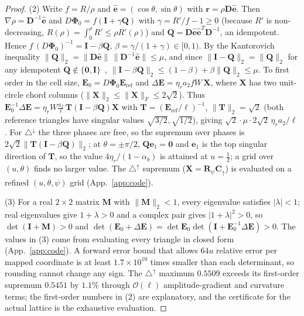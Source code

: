 \documentclass[11pt,a4paper]{article}
\theoremstyle{definition}
\theoremstyle{remark}
\begin{document}
\begin{proof}
(2) Write $f = R/\rho$ and $\hat{\mathbf{e}} = (\cos\theta,\sin\theta)$ with $\mathbf{r} = \rho\mathbf{D}\hat{\mathbf{e}}$. Then $\nabla\rho = \mathbf{D}^{-1}\hat{\mathbf{e}}$ and
$D\mathbf{\Phi}_0 = f(\mathbf{I}+\gamma\mathbf{Q})$ with $\gamma = R'/f - 1 \ge 0$ (because $R'$ is non-decreasing, $R(\rho)=\int_0^\rho R' \le \rho R'(\rho)$) and $\mathbf{Q} = \mathbf{D}\hat{\mathbf{e}}\hat{\mathbf{e}}^T\mathbf{D}^{-1}$, an idempotent. Hence $f\,(D\mathbf{\Phi}_0)^{-1} = \mathbf{I}-\beta\mathbf{Q}$, $\beta = \gamma/(1+\gamma)\in[0,1)$. By the Kantorovich inequality $\|\mathbf{Q}\|_2 = \|\mathbf{D}\hat{\mathbf{e}}\|\,\|\mathbf{D}^{-1}\hat{\mathbf{e}}\| \le \mu$, and since $\|\mathbf{I}-\mathbf{Q}\|_2 = \|\mathbf{Q}\|_2$ for any idempotent $\mathbf{Q}\notin\{\mathbf{0},\mathbf{I}\}$~\cite{szyld2006}, $\|\mathbf{I}-\beta\mathbf{Q}\|_2 \le (1-\beta)+\beta\|\mathbf{Q}\|_2 \le \mu$. To first order in the cell size, $\mathbf{E}_0 = D\mathbf{\Phi}_0\mathbf{E}_{\text{ref}}$ and $\Delta\mathbf{E} = \eta_r a_2 fW\,\mathbf{X}$, where $\mathbf{X}$ has two unit-circle chord columns ($\|\mathbf{X}\|_2 \le \|\mathbf{X}\|_F \le 2\sqrt2$). Thus $\mathbf{E}_0^{-1}\Delta\mathbf{E} = \eta_r W\frac{a_2}{\ell}\,\mathbf{T}(\mathbf{I}-\beta\mathbf{Q})\mathbf{X}$ with $\mathbf{T} = (\mathbf{E}_{\text{ref}}/\ell)^{-1}$, $\|\mathbf{T}\|_2 = \sqrt2$ (both reference triangles have singular values $\sqrt{3/2},\sqrt{1/2}$), giving $\sqrt2\cdot\mu\cdot2\sqrt2\,\eta_r a_2/\ell$. For $\triangle^{\downarrow}$ the three phases are free, so the supremum over phases is $2\sqrt2\|\mathbf{T}(\mathbf{I}-\beta\mathbf{Q})\|_2$; at $\theta=\pm\pi/2$, $\mathbf{Q}\mathbf{e}_1 = \mathbf{0}$ and $\mathbf{e}_1$ is the top singular direction of $\mathbf{T}$, so the value $4\eta_r/(1-\alpha_b)$ is attained at $u=\tfrac12$; a grid over $(u,\theta)$ finds no larger value. The $\triangle^{\uparrow}$ supremum ($\mathbf{X} = \mathbf{R}_{\psi}\mathbf{C}_{\uparrow}$) is evaluated on a refined $(u,\theta,\psi)$ grid (App.~\ref{app:code}).

(3) For a real $2\times2$ matrix $\mathbf{M}$ with $\|\mathbf{M}\|_2<1$, every eigenvalue satisfies $|\lambda|<1$; real eigenvalues give $1+\lambda>0$ and a complex pair gives $|1+\lambda|^2>0$, so $\det(\mathbf{I}+\mathbf{M})>0$ and $\det(\mathbf{E}_0+\Delta\mathbf{E}) = \det\mathbf{E}_0\det(\mathbf{I}+\mathbf{E}_0^{-1}\Delta\mathbf{E})>0$. The values in (3) come from evaluating every triangle in closed form (App.~\ref{app:code}). A forward error bound that allows $64u$ relative error per mapped coordinate is at least $1.7\times10^{10}$ times smaller than each determinant, so rounding cannot change any sign. The $\triangle^{\uparrow}$ maximum $0.5509$ exceeds its first-order supremum $0.5451$ by $1.1\%$ through $\mathcal{O}(\ell)$ amplitude-gradient and curvature terms; the first-order numbers in (2) are explanatory, and the certificate for the actual lattice is the exhaustive evaluation.
\end{proof}
\end{document}
